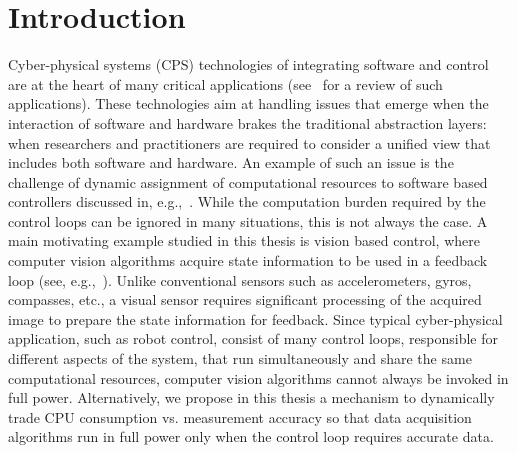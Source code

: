 \documentclass[ twoside, 12pt ]{article}
\begin{document}
\begin{titlepage}
    \hspace{3cm}
\end{titlepage}

\newpage


\newpage
{}


\newpage
\tableofcontents
\newpage
\listoffigures
\newpage



\section{Introduction} %
Cyber-physical systems (CPS) technologies of integrating software and control are at the heart of many critical applications (see~\cite{lee2008cyber} for a review of such applications). 
These technologies aim at handling issues that emerge when the interaction of software and hardware brakes the traditional abstraction layers: when researchers and practitioners are required to consider a unified view that includes both software and hardware. An example of such an issue is the challenge of dynamic assignment of computational resources to software based controllers discussed in, e.g.,~\cite{arzen2000introduction,tabuada2007event,weiss2007automata}. While the computation burden required by the control loops can be ignored in many situations, this is not always the case. A main motivating example studied in this thesis is vision based control, where computer vision algorithms acquire state information to be used in a feedback loop (see, e.g.,~\cite{das2002vision,shakernia1999landing,Efraim2017}). Unlike conventional sensors such as accelerometers, gyros, compasses, etc., a visual sensor requires significant processing of the acquired image to prepare the state information for feedback. Since typical cyber-physical application, such as robot control, consist of many control loops, responsible for different aspects of the system, that run simultaneously and share the same computational resources, computer vision algorithms cannot always be invoked in full power. Alternatively, we propose in this thesis a mechanism to dynamically trade CPU consumption vs. measurement accuracy so that data acquisition algorithms run in full power only when the control loop requires accurate data. 
\end{document}
